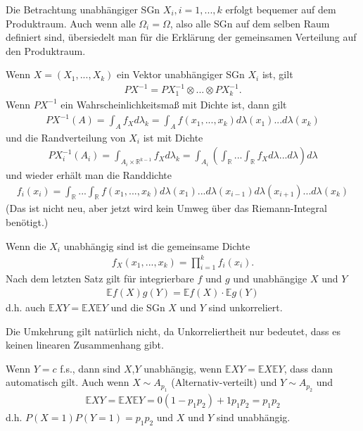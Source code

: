 \documentclass[]{article}
\begin{document}
Die Betrachtung unabhängiger SGn $X_i, i=1,...,k$ erfolgt bequemer auf dem Produktraum. Auch wenn alle $\Omega_i=\Omega$, also alle SGn auf dem selben Raum definiert sind, übersiedelt man für die Erklärung der gemeinsamen Verteilung auf den Produktraum.

Wenn $X=(X_1,...,X_k)$ ein Vektor unabhängiger SGn $X_i$ ist, gilt
\begin{align*}
	PX^{-1} = PX_1^{-1}\otimes ...\otimes PX_k^{-1}.
\end{align*}
Wenn $PX^{-1}$ ein Wahrscheinlichkeitsmaß mit Dichte ist, dann gilt
\begin{align*}
	PX^{-1}(A) = \int_A f_X d\lambda_k = \int_A f(x_1,...,x_k) d\lambda(x_1)...d\lambda(x_k)
\end{align*}
und die Randverteilung von $X_i$ ist mit Dichte
\begin{align*}
	PX_i^{-1}(A_i) = \int_{A_i\times\mathbb{R}^{k-1}} f_X d\lambda_k = \int_{A_i}\left(\int_\mathbb{R}...\int_\mathbb{R} f_X d\lambda ... d\lambda \right) d\lambda
\end{align*}
und wieder erhält man die Randdichte
\begin{align*}
	f_i(x_i) = \int_\mathbb{R} ...\int_\mathbb{R} f(x_1,...,x_k) d\lambda(x_1) ... d\lambda(x_{i-1}) d\lambda(x_{i+1}) ... d\lambda(x_k)
\end{align*}
(Das ist nicht neu, aber jetzt wird kein Umweg über das Riemann-Integral benötigt.)

Wenn die $X_i$ unabhängig sind ist die gemeinsame Dichte
\begin{align*}
	f_X(x_1,...,x_k) = \prod_{i=1}^{k}f_i(x_i).
\end{align*}
Nach dem letzten Satz gilt für integrierbare $f$ und $g$ und unabhängige $X$ und $Y$
\begin{align*}
	\mathbb{E}f(X)g(Y) = \mathbb{E}f(X)\cdot\mathbb{E}g(Y)
\end{align*}
d.h. auch $\mathbb{E}XY = \mathbb{E}X \mathbb{E}Y$ und die SGn $X$ und $Y$ sind unkorreliert.

Die Umkehrung gilt natürlich nicht, da Unkorreliertheit nur bedeutet, dass es keinen linearen Zusammenhang gibt.

Wenn $Y=c$ f.s., dann sind $X$,$Y$ unabhängig, wenn $\mathbb{E}XY = \mathbb{E}X\mathbb{E}Y$, dass dann automatisch gilt. Auch wenn $X\sim A_{p_1}$ (Alternativ-verteilt) und $Y\sim A_{p_2}$ und
\begin{align*}
	\mathbb{E}XY = \mathbb{E}X\mathbb{E}Y = 0(1-p_1p_2) + 1p_1p_2 = p_1p_2
\end{align*}
d.h. $P(X=1)P(Y=1)=p_1p_2$ und $X$ und $Y$ sind unabhängig.
\end{document}
